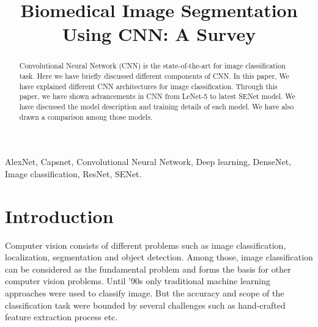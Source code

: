 \documentclass[conference]{IEEEtran}
\title{Biomedical Image Segmentation Using CNN: A Survey}
\begin{document}
	\author{
		\and
		\and
		}
	
	
	\IEEEoverridecommandlockouts
	
	\maketitle

\begin{abstract}
	Convolutional Neural Network (CNN) is the state-of-the-art for image classification task. Here we have briefly discussed different components of CNN. In this paper, We have explained different CNN architectures for image classification. Through this paper, we have shown advancements in CNN from LeNet-5 to latest SENet model. We have discussed the model description and training details of each model. We have also drawn a comparison among those models. 
	
\end{abstract}

 \begin{IEEEkeywords}
	AlexNet, Capsnet, Convolutional Neural Network, Deep learning, DenseNet, Image classification, ResNet, SENet. 
\end{IEEEkeywords}

\section{Introduction}
Computer vision consists of different problems such as image classification, localization, segmentation and object detection. Among those, image classification can be considered as the fundamental problem and forms the basis for other computer vision problems. Until '90s only traditional machine learning approaches were used to classify image. But the accuracy and scope of the classification task were bounded by several challenges such as hand-crafted feature extraction process etc.
\end{document}
